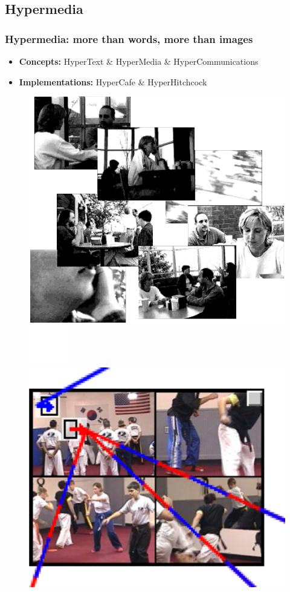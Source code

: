 \documentclass[compress]{beamer}
\begin{document}
	\subsection{Hypermedia}
  		\begin{frame}[c]
		\frametitle{Hypermedia: more than words, more than images}
		\begin{itemize}
		\item \textbf{Concepts:} HyperText \& HyperMedia \& HyperCommunications
		\vfill
		\item \textbf{Implementations:} HyperCafe \& HyperHitchcock  %
				
		\end{itemize}
		
		\begin{figure}
			\includegraphics[height=0.4\textheight]{figures/hypercafe.png}
			\includegraphics[height=0.1\textheight]{figures/space.png}
			\includegraphics[height=0.4\textheight]{figures/hitchcock.png}

\end{figure}
\end{frame}
\end{document}
